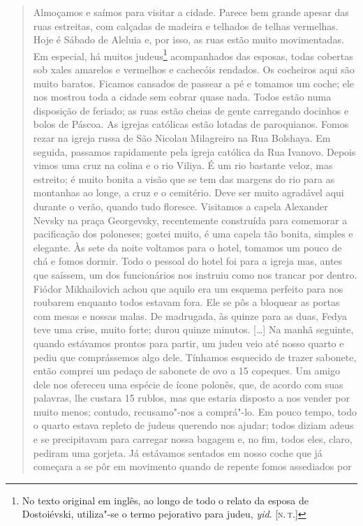 \begin{quote}
Almoçamos e saímos para visitar a cidade. Parece bem grande apesar das
ruas estreitas, com calçadas de madeira e telhados de telhas vermelhas.
Hoje é Sábado de Aleluia e, por isso, as ruas estão muito movimentadas.
Em especial, há muitos judeus\footnote{No texto original em inglês, ao longo de todo o relato da esposa de Dostoiévski, utiliza"-se o termo pejorativo para judeu, \textit{yid}. [\textsc{n.\,t.}]} acompanhados das esposas, todas cobertas sob xales amarelos e vermelhos e cachecóis rendados. Os
cocheiros aqui são muito baratos. Ficamos cansados de passear a pé e
tomamos um coche; ele nos mostrou toda a cidade sem cobrar quase nada.
Todos estão numa disposição de feriado; as ruas estão cheias de gente
carregando docinhos e bolos de Páscoa. As igrejas católicas estão
lotadas de paroquianos. Fomos rezar na igreja russa de São Nicolau
Milagreiro na Rua Bolshaya. Em seguida, passamos rapidamente pela igreja
católica da Rua Ivanovo. Depois vimos uma cruz na colina e o rio Viliya.
É um rio bastante veloz, mas estreito; é muito bonita a visão que se tem
das margens do rio para as montanhas ao longe, a cruz e o cemitério.
Deve ser muito agradável aqui durante o verão, quando tudo floresce.
Visitamos a capela Alexander Nevsky na praça Georgevsky, recentemente
construída para comemorar a pacificação dos poloneses; gostei muito, é
uma capela tão bonita, simples e elegante. Às sete da noite voltamos
para o hotel, tomamos um pouco de chá e fomos dormir. Todo o pessoal do
hotel foi para a igreja mas, antes que saíssem, um dos funcionários nos
instruiu como nos trancar por dentro. Fiódor Mikhailovich achou que
aquilo era um esquema perfeito para nos roubarem enquanto todos estavam
fora. Ele se pôs a bloquear as portas com mesas e nossas malas. De
madrugada, às quinze para as duas, Fedya teve uma crise, muito forte;
durou quinze minutos. [\ldots{}] Na manhã seguinte, quando estávamos
prontos para partir, um judeu veio até nosso quarto e pediu que
comprássemos algo dele. Tínhamos esquecido de trazer sabonete, então
comprei um pedaço de sabonete de ovo a 15 copeques. Um amigo dele nos
ofereceu uma espécie de ícone polonês, que, de acordo com suas palavras,
lhe custara 15 rublos, mas que estaria disposto a nos vender por muito
menos; contudo, recusamo"-nos a comprá"-lo. Em pouco tempo, todo o quarto
estava repleto de judeus querendo nos ajudar; todos diziam adeus e se
precipitavam para carregar nossa bagagem e, no fim, todos eles, claro,
pediram uma gorjeta. Já estávamos sentados em nosso coche que já
começara a se pôr em movimento quando de repente fomos assediados por

\end{quote}
